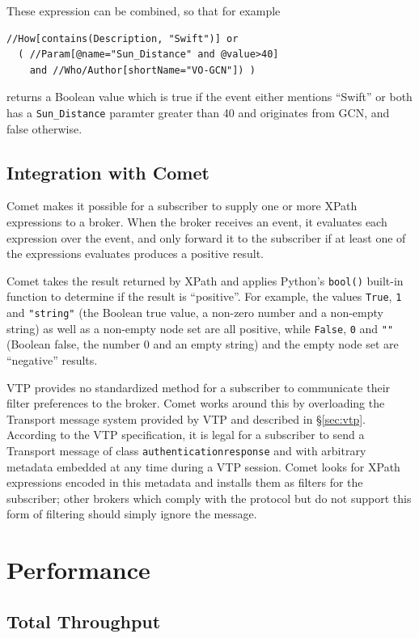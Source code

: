 \documentclass[5p,authoryear]{elsarticle}
\begin{document}
These expression can be combined, so that for example
\begin{verbatim}
//How[contains(Description, "Swift")] or
  ( //Param[@name="Sun_Distance" and @value>40]
    and //Who/Author[shortName="VO-GCN"]) )
\end{verbatim}
returns a Boolean value which is true if the event either mentions ``Swift''
or both has a \texttt{Sun\_Distance} paramter greater than 40 and originates
from GCN, and false otherwise.

\subsection{Integration with Comet}

Comet makes it possible for a subscriber to supply one or more XPath
expressions to a broker. When the broker receives an event, it evaluates each
expression over the event, and only forward it to the subscriber if at least
one of the expressions evaluates produces a positive result.

Comet takes the result returned by XPath and applies Python's \texttt{bool()}
built-in function to determine if the result is ``positive''. For example, the
values \texttt{True}, \texttt{1} and \texttt{"string"} (the Boolean true
value, a non-zero number and a non-empty string) as well as a non-empty node
set are all positive, while \texttt{False}, \texttt{0} and \texttt{""}
(Boolean false, the number 0 and an empty string) and the empty node set are
``negative'' results.

VTP provides no standardized method for a subscriber to communicate their
filter preferences to the broker. Comet works around this by overloading the
Transport message system provided by VTP and described in \S\ref{sec:vtp}.
According to the VTP specification, it is legal for a subscriber to send a
Transport message of class \texttt{authenticationresponse} and with arbitrary
metadata embedded at any time during a VTP session. Comet looks for XPath
expressions encoded in this metadata and installs them as filters for the
subscriber; other brokers which comply with the protocol but do not support
this form of filtering should simply ignore the message.

\section{Performance}
\label{sec:perf}

\subsection{Total Throughput}
\label{sec:perf:total}
\end{document}
